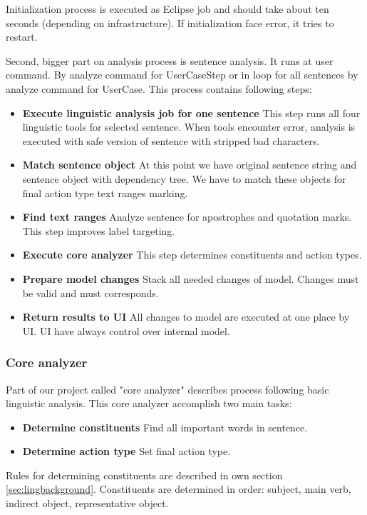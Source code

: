Initialization process is executed as Eclipse job and should take about ten seconds (depending on infrastructure). If initialization face error, it tries to restart.

Second, bigger part on analysis process is sentence analysis. It runs at user command. By analyze command for UserCaseStep or in loop for all sentences by analyze command for UserCase. This process contains following steps:

\begin{itemize}
\item {\bf Execute linguistic analysis job for one sentence} This step runs all four linguistic tools for selected sentence. When tools encounter error, analysis is executed with safe version of sentence with stripped bad characters. 
\item {\bf Match sentence object} At this point we have original sentence string and sentence object with dependency tree. We have to match these objects for final action type text ranges marking.
\item {\bf Find text ranges} Analyze sentence for apostrophes and quotation marks. This step improves label targeting.
\item {\bf Execute core analyzer} This step determines constituents and action types.
\item {\bf Prepare model changes} Stack all needed changes of model. Changes must be valid and must corresponds.
\item {\bf Return results to UI} All changes to model are executed at one place by UI. UI have always control over internal model.
\end{itemize}

\subsubsection{Core analyzer}
Part of our project called "core analyzer" describes process following basic linguistic analysis. This core analyzer accomplish two main tasks:

\begin{itemize}
\item {\bf Determine constituents} Find all important words in sentence.
\item {\bf Determine action type} Set final action type.
\end{itemize}

Rules for determining constituents are described in own section \ref{sec:lingbackground}. Constituents are determined in order: subject, main verb, indirect object, representative object.

